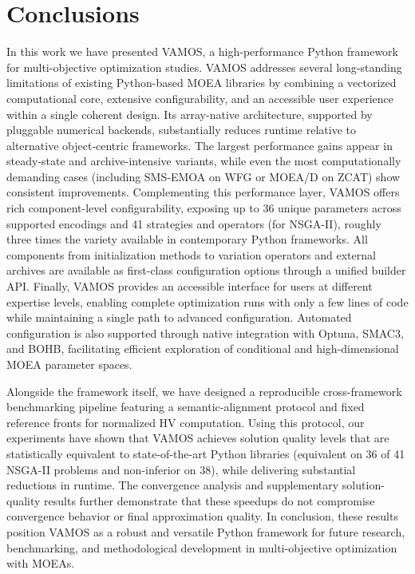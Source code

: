 \documentclass[journal]{IEEEtran}
\newcommand{\VAMOS}{VAMOS}
\begin{document}
\section{Conclusions}
\label{sec:conclusions}

In this work we have presented \VAMOS{}, a high‑performance Python framework for multi-objective optimization studies. \VAMOS{} addresses several long‑standing limitations of existing Python-based MOEA libraries by combining a vectorized computational core, extensive configurability, and an accessible user experience within a single coherent design. Its array-native architecture, supported by pluggable numerical backends, substantially reduces runtime relative to alternative object‑centric frameworks. The largest performance gains appear in steady‑state and archive-intensive variants, while even the most computationally demanding cases (including SMS‑EMOA on WFG or MOEA/D on ZCAT) show consistent improvements. Complementing this performance layer, \VAMOS{} offers rich component-level configurability, exposing up to 36 unique parameters across supported encodings and 41 strategies and operators (for NSGA-II), roughly three times the variety available in contemporary Python frameworks. All components from initialization methods to variation operators and external archives are available as first-class configuration options through a unified builder API. Finally, \VAMOS{} provides an accessible interface for users at different expertise levels, enabling complete optimization runs with only a few lines of code while maintaining a single path to advanced configuration. Automated configuration is also supported through native integration with Optuna, SMAC3, and BOHB, facilitating efficient exploration of conditional and high-dimensional MOEA parameter spaces.

Alongside the framework itself, we have designed a reproducible cross-framework benchmarking pipeline featuring a semantic-alignment protocol and fixed reference fronts for normalized HV computation. Using this protocol, our experiments have shown that \VAMOS{} achieves solution quality levels that are statistically equivalent to state-of-the-art Python libraries (equivalent on 36 of 41 NSGA-II problems and non-inferior on 38), while delivering substantial reductions in runtime.  The convergence analysis and supplementary solution-quality results further demonstrate that these speedups do not compromise convergence behavior or final approximation quality. In conclusion, these results position \VAMOS{} as a robust and versatile Python framework for future research, benchmarking, and methodological development in multi-objective optimization with MOEAs.
\end{document}
